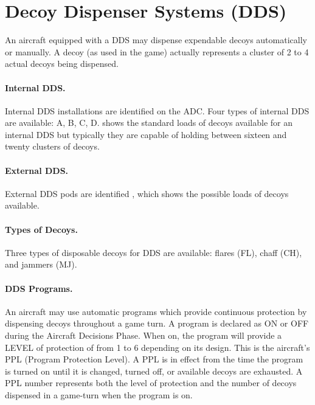 
\section{Decoy Dispenser Systems (DDS)}
\label{rule:dds}

An aircraft equipped with a DDS may dispense expendable decoys automatically or manually. A decoy (as used in the game) actually represents a cluster of 2 to 4 actual decoys being dispensed.


\paragraph{Internal DDS.} Internal DDS installations are identified on the ADC. Four types of internal DDS are available: A, B, C, D.  shows the standard loads of decoys available for an internal DDS but typically they are capable of holding between sixteen and twenty clusters of decoys.

\paragraph{External DDS.} External DDS pods are identified , which shows the possible loads of decoys available.

\paragraph{Types of Decoys.} Three types of disposable decoys for DDS are available: flares (FL), chaff (CH), and jammers (MJ).

\paragraph{DDS Programs.} An aircraft may use automatic programs which provide continuous protection by dispensing decoys throughout a game turn. A program is declared as ON or OFF during the Aircraft Decisions Phase. When on, the program will provide a LEVEL of protection of from 1 to 6 depending on its design. This is the aircraft's PPL (Program Protection Level). A PPL is in effect from the time the program is turned on until it is changed, turned off, or available decoys are exhausted. A PPL number represents both the level of protection and the number of decoys dispensed in a game-turn when the program is on.

